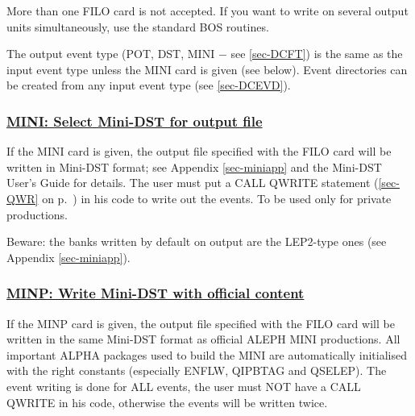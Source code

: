 \par More than one FILO card is not accepted. If you want to write
on
several output units simultaneously, use the standard BOS routines.
\par The output event type (POT, DST, MINI $-$ see
\ref{sec-DCFT})
is the same as the input event type unless the MINI card
is given (see below). Event directories can be created
from any input event type (see \ref{sec-DCEVD}).
\par
\par
\subsubsection{\underline{MINI:  Select Mini-DST for output file}}
\par
If the MINI card is given,
the output file specified with the FILO card will be written
in Mini-DST format; see Appendix \ref{sec-miniapp} and the
Mini-DST User's Guide for details. The user must put a CALL QWRITE statement  (\ref{sec-QWR} on p.~\pageref{sec-QWR})
in his code to write out the events. To be used only for private productions.

Beware: the banks written by default on output are the LEP2-type ones (see Appendix \ref{sec-miniapp}).

\par
\subsubsection{\underline{MINP:  Write Mini-DST with official content}}
\par
If the MINP card is given,
the output file specified with the FILO card will be written
in the same Mini-DST format as official ALEPH MINI productions. All important ALPHA packages 
used to build the MINI are automatically initialised with the right constants (especially ENFLW, QIPBTAG and QSELEP).
The event writing is done for ALL events, the user must NOT have a CALL QWRITE in his code,
otherwise the events will be written twice.



